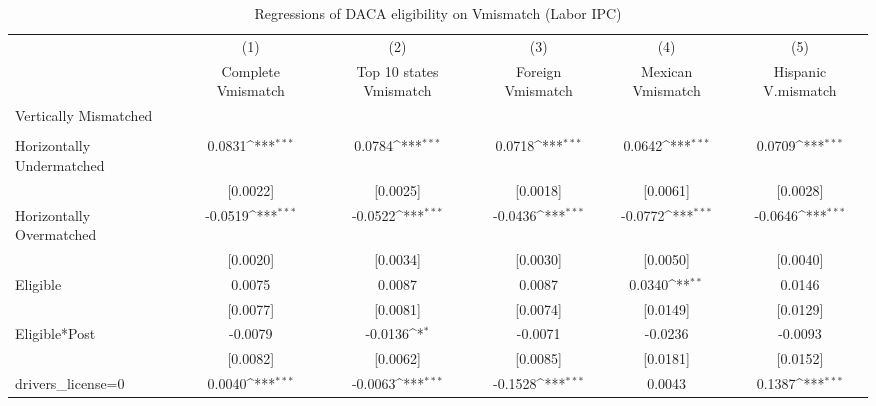 \begin{table}[htbp]\centering
\def\sym#1{\ifmmode^{#1}\else\(^{#1}\)\fi}
\caption{Regressions of DACA eligibility on Vmismatch (Labor IPC)}
\begin{tabular}{l*{5}{c}}
\toprule
                    &\multicolumn{1}{c}{(1)}         &\multicolumn{1}{c}{(2)}         &\multicolumn{1}{c}{(3)}         &\multicolumn{1}{c}{(4)}         &\multicolumn{1}{c}{(5)}         \\
                    &Complete Vmismatch         &Top 10 states Vmismatch         &Foreign Vmismatch         &Mexican Vmismatch         &Hispanic V.mismatch         \\
\midrule
Vertically Mismatched&                     &                     &                     &                     &                     \\
                    &                     &                     &                     &                     &                     \\
\addlinespace
Horizontally Undermatched&      0.0831\sym{***}&      0.0784\sym{***}&      0.0718\sym{***}&      0.0642\sym{***}&      0.0709\sym{***}\\
                    &    [0.0022]         &    [0.0025]         &    [0.0018]         &    [0.0061]         &    [0.0028]         \\
\addlinespace
Horizontally Overmatched&     -0.0519\sym{***}&     -0.0522\sym{***}&     -0.0436\sym{***}&     -0.0772\sym{***}&     -0.0646\sym{***}\\
                    &    [0.0020]         &    [0.0034]         &    [0.0030]         &    [0.0050]         &    [0.0040]         \\
\addlinespace
Eligible            &      0.0075         &      0.0087         &      0.0087         &      0.0340\sym{**} &      0.0146         \\
                    &    [0.0077]         &    [0.0081]         &    [0.0074]         &    [0.0149]         &    [0.0129]         \\
\addlinespace
Eligible*Post       &     -0.0079         &     -0.0136\sym{*}  &     -0.0071         &     -0.0236         &     -0.0093         \\
                    &    [0.0082]         &    [0.0062]         &    [0.0085]         &    [0.0181]         &    [0.0152]         \\
\addlinespace
drivers\_license=0   &      0.0040\sym{***}&     -0.0063\sym{***}&     -0.1528\sym{***}&      0.0043         &      0.1387\sym{***}\\

\end{tabular}
\end{table}
